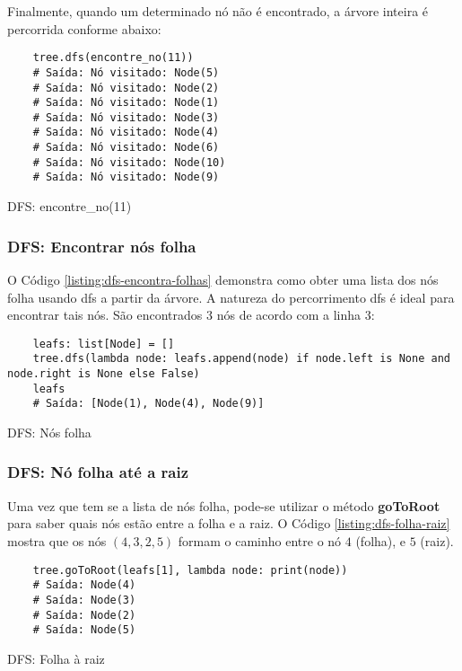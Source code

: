 Finalmente, quando um determinado nó não é encontrado, a árvore inteira é percorrida conforme abaixo:

\begin{listing}[H]
    \begin{verbatim}
    tree.dfs(encontre_no(11))
    # Saída: Nó visitado: Node(5)
    # Saída: Nó visitado: Node(2)
    # Saída: Nó visitado: Node(1)
    # Saída: Nó visitado: Node(3)
    # Saída: Nó visitado: Node(4)
    # Saída: Nó visitado: Node(6)
    # Saída: Nó visitado: Node(10)
    # Saída: Nó visitado: Node(9)
    \end{verbatim}
    \caption{DFS: encontre\_no(11)}
    \label{listing:dfs-encontra-no-11}
\end{listing}

\subsubsection{DFS: Encontrar nós folha}

O Código \ref{listing:dfs-encontra-folhas} demonstra como obter uma lista dos nós folha usando dfs a partir da árvore.
A natureza do percorrimento dfs é ideal para encontrar tais nós. São encontrados 3 nós de acordo com a linha 3:

\begin{listing}[H]
    \begin{verbatim}
    leafs: list[Node] = []
    tree.dfs(lambda node: leafs.append(node) if node.left is None and node.right is None else False)
    leafs
    # Saída: [Node(1), Node(4), Node(9)]
    \end{verbatim}
    \caption{DFS: Nós folha}
    \label{listing:dfs-encontra-folhas}
\end{listing}

\subsubsection{DFS: Nó folha até a raiz}

Uma vez que tem se a lista de nós folha, pode-se utilizar o método \textbf{goToRoot} para saber quais nós estão entre a folha e a raiz.
O Código \ref{listing:dfs-folha-raiz} mostra que os nós $(4, 3, 2, 5)$ formam o caminho entre o nó $4$ (folha), e $5$ (raiz).

\begin{listing}[H]
    \begin{verbatim}
    tree.goToRoot(leafs[1], lambda node: print(node))
    # Saída: Node(4)
    # Saída: Node(3)
    # Saída: Node(2)
    # Saída: Node(5)
    \end{verbatim}
    \caption{DFS: Folha à raiz}
    \label{listing:dfs-folha-raiz}
\end{listing}

